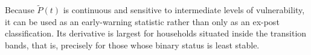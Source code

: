 \documentclass[11pt,a4paper]{article}
\begin{document}
Because $\tilde P(t)$ is continuous and sensitive to intermediate levels of vulnerability, it can be used as an early-warning statistic rather than only as an ex-post classification. Its derivative is largest for households situated inside the transition bands, that is, precisely for those whose binary status is least stable.






\end{document}
